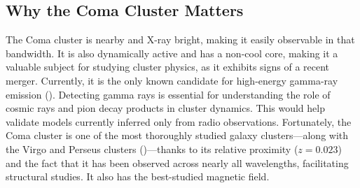 \documentclass[11pt,letterpaper]{article}
\begin{document}


\subsection{Why the Coma Cluster Matters}  \label{sec:coma_cluster_why}
The Coma cluster is nearby and X-ray bright, making it easily observable in that bandwidth. It is also dynamically active and has a non-cool core, making it a valuable subject for studying cluster physics, as it exhibits signs of a recent merger. Currently, it is the only known candidate for high-energy gamma-ray emission (\cite{baghmanyan_detailed_2022}). Detecting gamma rays is essential for understanding the role of cosmic rays and pion decay products in cluster dynamics. This would help validate models currently inferred only from radio observations. Fortunately, the Coma cluster is one of the most thoroughly studied galaxy clusters—along with the Virgo and Perseus clusters (\cite{lal_high-resolution_2022})—thanks to its relative proximity ($z = 0.023$) and the fact that it has been observed across nearly all wavelengths, facilitating structural studies. It also has the best-studied magnetic field.

\end{document}
